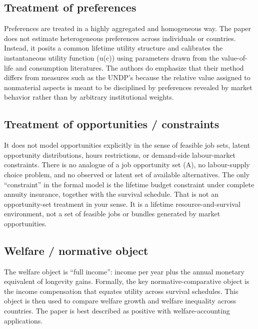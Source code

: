 \documentclass[11pt,a4paper]{article}
\begin{document}
\subsection*{Treatment of preferences}
Preferences are treated in a highly aggregated and homogeneous way. The paper does not estimate heterogeneous preferences across individuals or countries. Instead, it posits a common lifetime utility structure and calibrates the instantaneous utility function (u(c)) using parameters drawn from the value-of-life and consumption literatures. The authors do emphasize that their method differs from measures such as the UNDP’s because the relative value assigned to nonmaterial aspects is meant to be disciplined by preferences revealed by market behavior rather than by arbitrary institutional weights.

\subsection*{Treatment of opportunities / constraints}
It does not model opportunities explicitly in the sense of feasible job sets, latent opportunity distributions, hours restrictions, or demand-side labour-market constraints. There is no analogue of a job opportunity set (A), no labour-supply choice problem, and no observed or latent set of available alternatives. The only “constraint” in the formal model is the lifetime budget constraint under complete annuity insurance, together with the survival schedule. That is not an opportunity-set treatment in your sense. It is a lifetime resource-and-survival environment, not a set of feasible jobs or bundles generated by market opportunities.

\subsection*{Welfare / normative object}
The welfare object is “full income”: income per year plus the annual monetary equivalent of longevity gains. Formally, the key normative-comparative object is the income compensation that equates utility across survival schedules. This object is then used to compare welfare growth and welfare inequality across countries. The paper is best described as positive with welfare-accounting applications.
\end{document}
